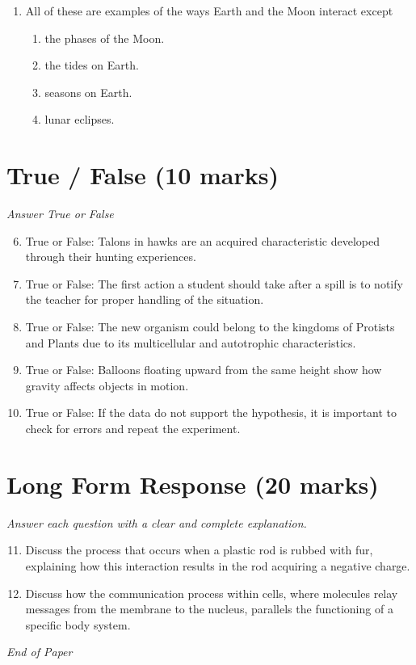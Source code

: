 \documentclass[12pt]{article}
\begin{document}
\begin{enumerate}[label=\arabic*.]
\begin{enumerate}[label=(\alph*)]
    \item increases the supply of resources
    \item decreases the amount of resources
    \item results in less demand for resources
    \item improves the quality of the resources
\end{enumerate}
\item All of these are examples of the ways Earth and the Moon interact except
\begin{enumerate}[label=(\alph*)]
    \item the phases of the Moon.
    \item the tides on Earth.
    \item seasons on Earth.
    \item lunar eclipses.
\end{enumerate}
\end{enumerate}

\section*{True / False (10 marks)}
\textit{Answer True or False}
\begin{enumerate}[label=\arabic*.]
\setcounter{enumi}{5}
\item True or False: Talons in hawks are an acquired characteristic developed through their hunting experiences.
\item True or False: The first action a student should take after a spill is to notify the teacher for proper handling of the situation.
\item True or False: The new organism could belong to the kingdoms of Protists and Plants due to its multicellular and autotrophic characteristics.
\item True or False: Balloons floating upward from the same height show how gravity affects objects in motion.
\item True or False: If the data do not support the hypothesis, it is important to check for errors and repeat the experiment.
\end{enumerate}

\section*{Long Form Response (20 marks)}
\textit{Answer each question with a clear and complete explanation.}
\begin{enumerate}[label=\arabic*.]
\setcounter{enumi}{10}
\item Discuss the process that occurs when a plastic rod is rubbed with fur, explaining how this interaction results in the rod acquiring a negative charge.
\item Discuss how the communication process within cells, where molecules relay messages from the membrane to the nucleus, parallels the functioning of a specific body system.
\end{enumerate}

\vfill
\noindent\textit{End of Paper}
\end{document}
